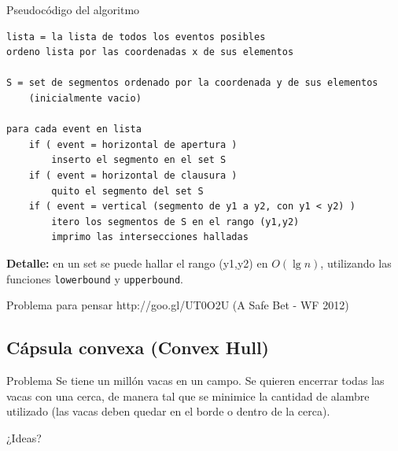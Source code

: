 \documentclass[compress]{beamer}
\newcommand{\bigpause}{\bigskip \pause}
\begin{document}
\begin{frame}[fragile]{Pseudoc\'odigo del algoritmo}

\begin{lstlisting}
lista = la lista de todos los eventos posibles
ordeno lista por las coordenadas x de sus elementos

S = set de segmentos ordenado por la coordenada y de sus elementos
    (inicialmente vacio)

para cada event en lista
    if ( event = horizontal de apertura )
        inserto el segmento en el set S
    if ( event = horizontal de clausura )
        quito el segmento del set S
    if ( event = vertical (segmento de y1 a y2, con y1 < y2) )
        itero los segmentos de S en el rango (y1,y2)
        imprimo las intersecciones halladas

\end{lstlisting}

\textbf{Detalle:} en un set se puede hallar el rango (y1,y2) en $O(\lg n)$,
utilizando las funciones \texttt{lowerbound} y \texttt{upperbound}.

\end{frame}

\begin{frame}{Problema para pensar}
http://goo.gl/UT0O2U (A Safe Bet - WF 2012)
\end{frame}

\subsection{C\'apsula convexa (Convex Hull)}

\begin{frame}
\begin{block}{Problema}
Se tiene un mill\'on vacas en un campo. Se quieren encerrar todas las vacas con una cerca, de manera tal que se minimice la cantidad de alambre utilizado (las vacas deben quedar en el borde o dentro de la cerca).
\end{block}

¿Ideas? \bigpause

\end{frame}
\end{document}
